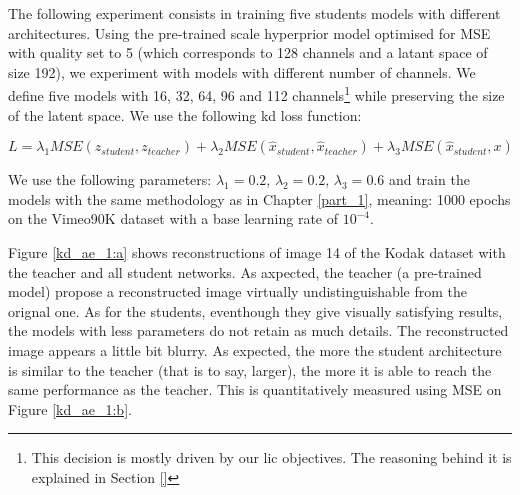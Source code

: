 The following experiment consists in training five students models with different architectures. Using the pre-trained scale hyperprior model optimised for MSE with \textsf{quality} set to 5 (which corresponds to 128 channels and a latant space of size 192), we experiment with models with different number of channels. We define five models with 16, 32, 64, 96 and 112 channels\footnote{This decision is mostly driven by our \acrshort{lic} objectives. The reasoning behind it is explained in Section \ref{}} while preserving the size of the latent space. We use the following \acrshort{kd} loss function:

\begin{equation}
    L = \lambda_{1} MSE(z_{student}, z_{teacher}) + \lambda_{2} MSE(\hat{x}_{student}, \hat{x}_{teacher}) + \lambda_{3} MSE(\hat{x}_{student}, x)
    \label{loss_1}
\end{equation}

We use the following parameters: \(\lambda_{1} = 0.2\), \(\lambda_{2} = 0.2\), \(\lambda_{3} = 0.6\) and train the models with the same methodology as in Chapter \ref{part_1}, meaning: 1000 epochs on the Vimeo90K dataset with a base learning rate of \(10^{-4}\).

Figure \ref{kd_ae_1:a} shows reconstructions of image 14 of the Kodak dataset with the teacher and all student networks. As axpected, the teacher (a pre-trained model) propose a reconstructed image virtually undistinguishable from the orignal one. As for the students, eventhough they give visually satisfying results, the models with less parameters do not retain as much details. The reconstructed image appears a little bit blurry. As expected, the more the student architecture is similar to the teacher (that is to say, larger), the more it is able to reach the same performance as the teacher. This is quantitatively measured using MSE on Figure \ref{kd_ae_1:b}.

